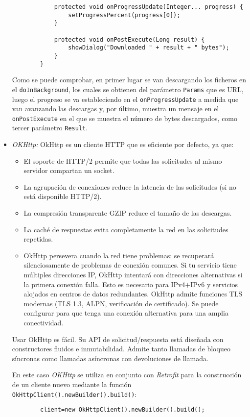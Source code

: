 \begin{itemize}
\begin{lstlisting}
            protected void onProgressUpdate(Integer... progress) {
                setProgressPercent(progress[0]);
            }

            protected void onPostExecute(Long result) {
                showDialog("Downloaded " + result + " bytes");
            }
        }
    \end{lstlisting}
    Como se puede comprobar, en primer lugar se van descargando los ficheros en
    el \texttt{doInBackground}, los cuales se obtienen del parámetro
    \texttt{Params} que es URL, luego el progreso se va estableciendo en el
    \texttt{onProgressUpdate} a medida que van avanzando las descargas y, por
    último, muestra un mensaje en el \texttt{onPostExecute} en el que se muestra
    el número de bytes descargados, como tercer parámetro \texttt{Result}.
    \item \textit{OKHttp: }
    OkHttp es un cliente HTTP que es eficiente por defecto, ya que:
    \begin{itemize}
        \item El soporte de HTTP/2 permite que todas las solicitudes al mismo
        servidor compartan un socket.
        \item La agrupación de conexiones reduce la latencia de las solicitudes
        (si no está disponible HTTP/2).
        \item La compresión transparente GZIP reduce el tamaño de las descargas.
        \item La caché de respuestas evita completamente la red en las
        solicitudes repetidas.
        \item OkHttp persevera cuando la red tiene problemas: se recuperará
        silenciosamente de problemas de conexión comunes. Si tu servicio tiene
        múltiples direcciones IP, OkHttp intentará con direcciones alternativas
        si la primera conexión falla. Esto es necesario para IPv4+IPv6 y
        servicios alojados en centros de datos redundantes. OkHttp admite
        funciones TLS modernas (TLS 1.3, ALPN, verificación de certificado). Se
        puede configurar para que tenga una conexión alternativa para una amplia
        conectividad.
    \end{itemize}
    Usar OkHttp es fácil. Su API de solicitud/respuesta está diseñada con
    constructores fluidos e inmutabilidad. Admite tanto llamadas de bloqueo
    síncronas como llamadas asíncronas con devoluciones de llamada.
    
    En este caso \textit{OKHttp} se utiliza en conjunto con \textit{Retrofit}
    para la construcción de un cliente nuevo mediante la función
    \texttt{OkHttpClient().newBuilder().build()}:
    \begin{lstlisting}
        client=new OkHttpClient().newBuilder().build();
    \end{lstlisting}
    

\end{itemize}
